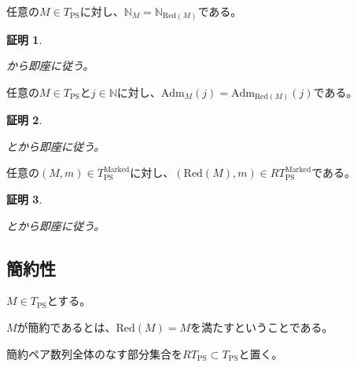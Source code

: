 \documentclass[dvipdfmx,uplatex]{jsarticle}
\theoremstyle{customnonumberbreakfortheorem}
\theoremstyle{customnonumberbreakforproof}
\newtheorem{hideableproof}{証明}
\begin{document}
\begin{proposition}\label{Redが許容性を保つこと}
	任意の\(M \in T_{\textrm{PS}}\)に対し、\(\mathbb{N}_M = \mathbb{N}_{\textrm{Red}(M)}\)である。
\end{proposition}

\begin{hideableproof}
	\begin{indented}
		\item {}から即座に従う。
	\end{indented}
\end{hideableproof}

\begin{corollary}\label{許容化のRed不変性}
	任意の\(M \in T_{\textrm{PS}}\)と\(j \in \mathbb{N}\)に対し、\(\textrm{Adm}_M(j) = \textrm{Adm}_{\textrm{Red}(M)}(j)\)である。
\end{corollary}

\begin{hideableproof}
	\begin{indented}
		\item {}とから即座に従う。
	\end{indented}
\end{hideableproof}

\begin{corollary}\label{Redが基点を保つこと}
	任意の\((M,m) \in T_{\textrm{PS}}^{\textrm{Marked}}\)に対し、\((\textrm{Red}(M),m) \in RT_{\textrm{PS}}^{\textrm{Marked}}\)である。
\end{corollary}

\begin{hideableproof}
	\begin{indented}
		\item {}とから即座に従う。
	\end{indented}
\end{hideableproof}


\subsection{簡約性}

\(M \in T_{\textrm{PS}}\)とする。
\begin{nenumerate}
	\item \(M\)が簡約であるとは、\(\textrm{Red}(M) = M\)を満たすということである。
	\item 簡約ペア数列全体のなす部分集合を\(RT_{\textrm{PS}} \subset T_{\textrm{PS}}\)と置く。
\end{nenumerate}
\end{document}
